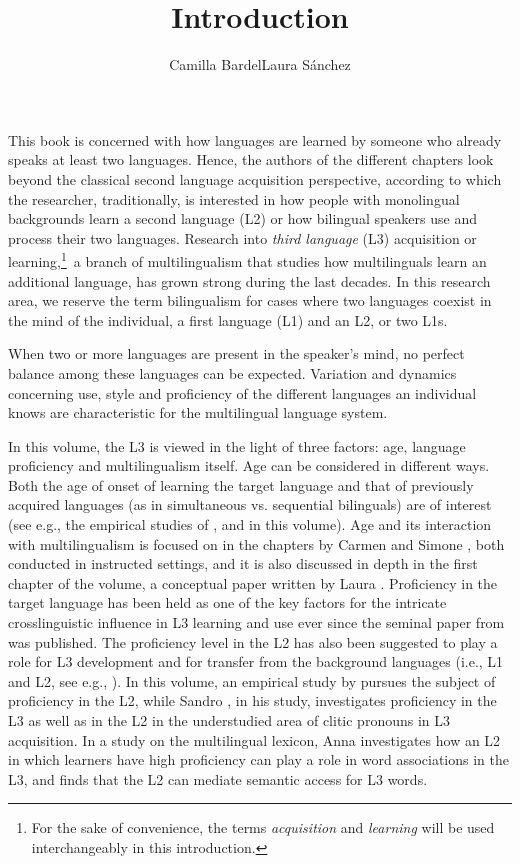 \documentclass[output=paper,colorlinks,citecolor=brown,nonflat]{langsci/langscibook}
\author{Camilla Bardel\affiliation{Stockholm University}\lastand Laura Sánchez\affiliation{Stockholm University}}
\title{Introduction}
\begin{document}
\maketitle

\noindent This book is concerned with how languages are learned by someone who already speaks at least two languages. Hence, the authors of the different chapters look beyond the classical second language acquisition perspective, according to which the researcher, traditionally, is interested in how people with monolingual backgrounds learn a second language (L2) or how bilingual speakers use and process their two languages. Research into \textit{third language} (L3) acquisition or learning,\footnote{For the sake of convenience, the terms \textit{acquisition} and \textit{learning} will be used interchangeably in this introduction.}~a branch of multilingualism that studies how multilinguals learn an additional language, has grown strong during the last decades. In this research area, we reserve the term bilingualism for cases where two languages coexist in the mind of the individual, a first language (L1) and an L2, or two L1s. 

When two or more languages are present in the speaker’s mind, no perfect balance among these languages can be expected. Variation and dynamics concerning use, style and proficiency of the different languages an individual knows are characteristic for the multilingual language system.

In this volume, the L3 is viewed in the light of three factors: age, language proficiency and multilingualism itself. Age can be considered in different ways. Both the age of onset of learning the target language and that of previously acquired languages (as in simultaneous vs. sequential bilinguals) are of interest (see e.g., the empirical studies of \citeauthor{chapters/munoz}, \citeauthor{chapters/pfenninger} and \citeauthor{chapters/sanchez7} in this volume). Age and its interaction with multilingualism is focused on in the chapters by Carmen \citeauthor{chapters/munoz} and Simone \citeauthor{chapters/pfenninger}, both conducted in instructed settings, and it is also discussed in depth in the first chapter of the volume, a conceptual paper written by Laura \citeauthor{chapters/sanchez1}. Proficiency in the target language has been held as one of the key factors for the intricate crosslinguistic influence in L3 learning and use ever since the seminal paper from \citet{WilliamsHammarberg1998} was published. The proficiency level in the L2 has also been suggested to play a role for L3 development and for transfer from the background languages (i.e., L1 and L2, see e.g., \citealt{BardelLindqvist2007, SánchezBardel2017Transfer}). In this volume, an empirical study by \citeauthor{chapters/sanchez7} pursues the subject of proficiency in the L2, while Sandro \citeauthor{chapters/sciutti}, in his study, investigates proficiency in the L3 as well as in the L2 in the understudied area of clitic pronouns in L3 acquisition. In a study on the multilingual lexicon, Anna \citeauthor{chapters/gudmundson} investigates how an L2 in which learners have high proficiency can play a role in word associations in the L3, and finds that the L2 can mediate semantic access for L3 words.
\end{document}
